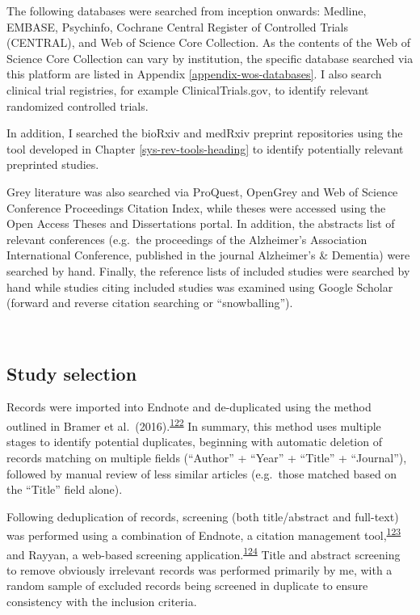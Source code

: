\documentclass[a4paper, twoside]{templates/ociamthesis}
\begin{document}
The following databases were searched from inception onwards: Medline, EMBASE, Psychinfo, Cochrane Central Register of Controlled Trials (CENTRAL), and Web of Science Core Collection. As the contents of the Web of Science Core Collection can vary by institution, the specific database searched via this platform are listed in Appendix \ref{appendix-wos-databases}. I also search clinical trial registries, for example ClinicalTrials.gov, to identify relevant randomized controlled trials.

In addition, I searched the bioRxiv and medRxiv preprint repositories using the tool developed in Chapter \ref{sys-rev-tools-heading} to identify potentially relevant preprinted studies.

Grey literature was also searched via ProQuest, OpenGrey and Web of Science Conference Proceedings Citation Index, while theses were accessed using the Open Access Theses and Dissertations portal. In addition, the abstracts list of relevant conferences (e.g.~the proceedings of the Alzheimer's Association International Conference, published in the journal Alzheimer's \& Dementia) were searched by hand. Finally, the reference lists of included studies were searched by hand while studies citing included studies was examined using Google Scholar (forward and reverse citation searching or ``snowballing'').

~

\hypertarget{study-selection}{%
\subsection{Study selection}\label{study-selection}}

Records were imported into Endnote and de-duplicated using the method outlined in Bramer et al.~(2016).\textsuperscript{\protect\hyperlink{ref-bramer2016}{122}} In summary, this method uses multiple stages to identify potential duplicates, beginning with automatic deletion of records matching on multiple fields (``Author'' + ``Year'' + ``Title'' + ``Journal''), followed by manual review of less similar articles (e.g.~those matched based on the ``Title'' field alone).

Following deduplication of records, screening (both title/abstract and full-text) was performed using a combination of Endnote, a citation management tool,\textsuperscript{\protect\hyperlink{ref-hupe2019}{123}} and Rayyan, a web-based screening application.\textsuperscript{\protect\hyperlink{ref-ouzzani2016}{124}} Title and abstract screening to remove obviously irrelevant records was performed primarily by me, with a random sample of excluded records being screened in duplicate to ensure consistency with the inclusion criteria.
\end{document}
